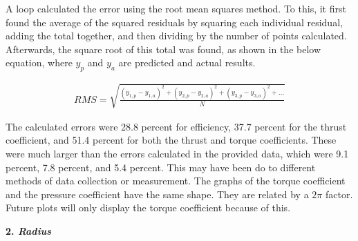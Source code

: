 \documentclass{article}
\begin{document}
A loop calculated the error using the root mean squares method. To this, it first found the average of the squared residuals by squaring each individual residual, adding the total together, and then dividing by the number of points calculated. Afterwards, the square root of this total was found, as shown in the below equation, where $y_{p}$ and $y_{a}$ are predicted and actual results. \newline

\begin{equation}
\begin{aligned}
	RMS = \sqrt{\frac{(y_{1,p}-y_{1,a})^{2} + (y_{2,p}-y_{2,a})^{2} + (y_{3,p}-y_{3,a})^{2} + ...}{N}}
\end{aligned}
\end{equation}

 The calculated errors were 28.8 percent for efficiency, 37.7 percent for the thrust coefficient, and 51.4 percent for both the thrust and torque coefficients. These were much larger than the errors calculated in the provided data, which were 9.1 percent, 7.8 percent, and 5.4 percent. This may have been do to different methods of data collection or measurement. The graphs of the torque coefficient and the pressure coefficient have the same shape. They are related by a $2 \pi$ factor. Future plots will only display the torque coefficient because of this. \newline

\textbf{2. \emph{Radius}} \newline
\end{document}
